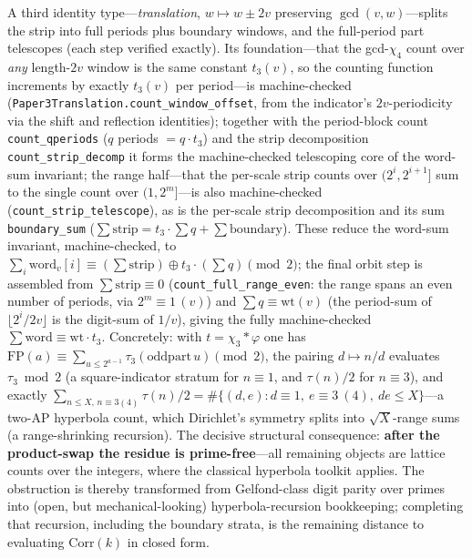 \documentclass[11pt]{article}
\theoremstyle{remark}\newtheorem{remark}[theorem]{Remark}
\begin{document}
A third identity type---\emph{translation}, $w\mapsto w\pm2v$ preserving $\gcd(v,w)$---splits the
strip into full periods plus boundary windows, and the full-period part telescopes (each step
verified exactly). Its foundation---that the gcd-$\chi_4$ count over \emph{any} length-$2v$ window is
the same constant $t_3(v)$, so the counting function increments by exactly $t_3(v)$ per period---is
machine-checked (\texttt{Paper3Translation.count\_window\_offset}, from the indicator's $2v$-periodicity
via the shift and reflection identities); together with the period-block count
\texttt{count\_qperiods} ($q$ periods $=q\cdot t_3$) and the strip decomposition
\texttt{count\_strip\_decomp} it forms the machine-checked telescoping core of the word-sum invariant; the range half---that the per-scale strip counts over $(2^i,2^{i+1}]$ sum to the single count over $(1,2^m]$---is also machine-checked (\texttt{count\_strip\_telescope}), as is the per-scale strip decomposition and its sum \texttt{boundary\_sum} ($\sum\mathrm{strip}=t_3\cdot\sum q+\sum\mathrm{boundary}$). These reduce the word-sum invariant, machine-checked, to $\sum_i\mathrm{word}_v[i]\equiv(\sum\mathrm{strip})\oplus t_3\cdot(\sum q)\pmod2$; the final orbit step is assembled from $\sum\mathrm{strip}\equiv0$ (\texttt{count\_full\_range\_even}: the range spans an even number of periods, via $2^m\equiv1\,(v)$) and $\sum q\equiv\mathrm{wt}(v)$ (the period-sum of $\lfloor2^{i}/2v\rfloor$ is the digit-sum of $1/v$), giving the fully machine-checked $\sum\mathrm{word}\equiv\mathrm{wt}\cdot t_3$.
Concretely: with $t=\chi_3*\varphi$ one has
$\mathrm{FP}(a)\equiv\sum_{u\le2^{a-1}}\tau_3(\mathrm{oddpart}\,u)\pmod2$, the pairing $d\mapsto n/d$
evaluates $\tau_3\bmod2$ (a square-indicator stratum for $n\equiv1$, and $\tau(n)/2$ for
$n\equiv3$), and exactly
$\sum_{n\le X,\,n\equiv3(4)}\tau(n)/2=\#\{(d,e):d\equiv1,\ e\equiv3\ (4),\ de\le X\}$---a two-AP
hyperbola count, which Dirichlet's symmetry splits into $\sqrt X$-range sums (a range-shrinking
recursion). The decisive structural consequence: \textbf{after the product-swap the residue is
prime-free}---all remaining objects are lattice counts over the integers, where the classical
hyperbola toolkit applies. The obstruction is thereby transformed from Gelfond-class digit parity
over primes into (open, but mechanical-looking) hyperbola-recursion bookkeeping; completing that
recursion, including the boundary strata, is the remaining distance to evaluating
$\mathrm{Corr}(k)$ in closed form.
\end{document}
